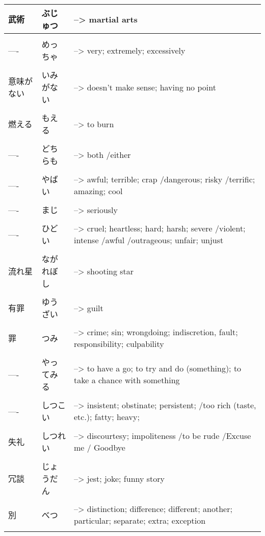 \documentclass{article}
\begin{document}
\begin{tabular}{ l | l p{14cm}  }
武術 & ぶじゅつ &--> martial arts \\ \hline\\[-1em]
---- & めっちゃ &--> very; extremely; excessively \\ \hline\\[-1em]
意味がない & いみがない &--> doesn't make sense; having no point \\ \hline\\[-1em]
燃える & もえる &--> to burn\\ \hline\\[-1em]
---- & どちらも &--> both /either\\ \hline\\[-1em]
---- & やばい &--> awful; terrible; crap /dangerous; risky /terrific; amazing; cool\\ \hline\\[-1em]
---- & まじ &--> seriously\\ \hline\\[-1em]
---- & ひどい  &--> cruel; heartless; hard; harsh; severe /violent; intense /awful /outrageous; unfair; unjust \\ \hline\\[-1em]
流れ星 & ながれぼし &--> shooting star \\ \hline\\[-1em]
有罪 & ゆうざい &--> guilt \\ \hline\\[-1em]
罪 & つみ &--> crime; sin; wrongdoing; indiscretion, fault; responsibility; culpability\\ \hline\\[-1em]
---- & やってみる &--> to have a go; to try and do (something); to take a chance with something \\ \hline\\[-1em]
---- & しつこい &-->  insistent; obstinate; persistent; /too rich (taste, etc.); fatty; heavy; \\ \hline\\[-1em]
失礼 & しつれい &--> discourtesy; impoliteness /to be rude /Excuse me / Goodbye\\ \hline\\[-1em]
冗談 & じょうだん &--> jest; joke; funny story \\ \hline\\[-1em]
別 & べつ &--> distinction; difference; different; another; particular; separate; extra; exception \\ \hline\\[-1em]

\end{tabular}
\end{document}
